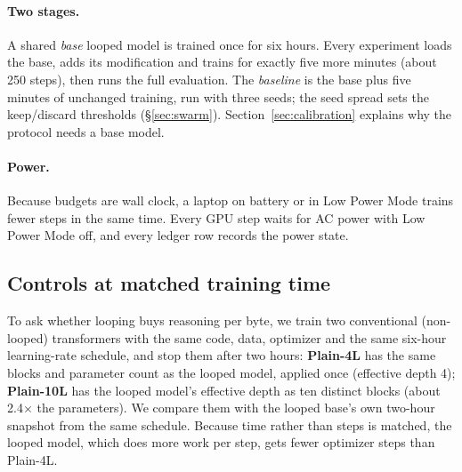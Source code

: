 \paragraph{Two stages.} A shared \emph{base} looped model is trained once for six hours. Every experiment
loads the base, adds its modification and trains for exactly five more minutes (about 250 steps), then runs the full evaluation. The \emph{baseline} is the base plus five minutes of
unchanged training, run with three seeds; the seed spread sets the keep/discard thresholds
(\S\ref{sec:swarm}). Section~\ref{sec:calibration} explains why the protocol needs a base model.

\paragraph{Power.} Because budgets are wall clock, a laptop on battery or in Low Power Mode trains fewer
steps in the same time. Every GPU step waits for AC power with Low Power Mode off, and every ledger row
records the power state.

\subsection{Controls at matched training time}\label{sec:control-def}
To ask whether looping buys reasoning per byte, we train two conventional (non-looped) transformers
with the same code, data, optimizer and the same six-hour learning-rate schedule, and stop them after
two hours: \textbf{Plain-4L} has the same blocks and parameter count as the looped model, applied once
(effective depth 4); \textbf{Plain-10L} has the looped model's effective depth as ten distinct blocks
(about 2.4$\times$ the parameters). We compare them with the looped base's own two-hour snapshot from
the same schedule. Because time rather than steps is matched, the looped model, which does more work per
step, gets fewer optimizer steps than Plain-4L.

